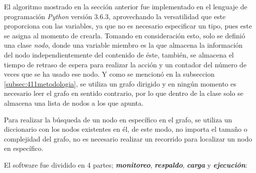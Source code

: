 
El algoritmo mostrado en la secci\'on anterior fue implementado en el
 lenguaje de programaci\'on \emph{Python} versi\'on 3.6.3, aprovechando la
 versatilidad que este proporciona con las variables, ya que
 no es necesario especificar un tipo, pues este se asigna al momento de 
 crearla. Tomando en consideraci\'on esto, solo se defini\'o una clase 
 \emph{nodo}, donde una variable miembro es la que almacena la informaci\'on 
 del nodo independientemente del contenido de \'este, tambi\'en, se almacena 
 el tiempo de retraso de espera para realizar la acci\'on y un contador del 
 n\'umero de veces que se ha usado ese nodo. Y como se mencion\'o en la 
 subseccion \ref{subsec:411metodologia}, se utiliza un grafo dirigido y en 
 ning\'un momento es necesario leer el grafo en sentido contrario, por lo 
 que dentro de la clase solo se almacena una lista de nodos a los que 
 apunta. 


Para realizar la b\'usqueda de un nodo en espec\'ifico en el grafo, se
 utiliza un diccionario con los nodos existentes en \'el, de este modo, no
 importa el tama\~no o complejidad del grafo, no es necesario
 realizar un recorrido para localizar un nodo en espec\'ifico.

\newpage
El software fue dividido en 4 partes; \textbf{\emph{monitoreo}},
 \textbf{\emph{respaldo}}, \textbf{\emph{carga}} y 
 \textbf{\emph{ejecuci\'on}}:

